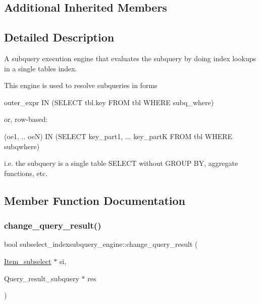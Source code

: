 \subsection*{Additional Inherited Members}


\subsection{Detailed Description}
A subquery execution engine that evaluates the subquery by doing index lookups in a single table\textquotesingle{}s index.

This engine is used to resolve subqueries in forms

outer\+\_\+expr IN (S\+E\+L\+E\+CT tbl.\+key F\+R\+OM tbl W\+H\+E\+RE subq\+\_\+where)

or, row-\/based\+:

(oe1, .. oeN) IN (S\+E\+L\+E\+CT key\+\_\+part1, ... key\+\_\+partK F\+R\+OM tbl W\+H\+E\+RE subqwhere)

i.\+e. the subquery is a single table S\+E\+L\+E\+CT without G\+R\+O\+UP BY, aggregate functions, etc. 

\subsection{Member Function Documentation}
\mbox{\label{classsubselect__indexsubquery__engine_a003053e9d46291cb9323b22a29f90c9b}} 
\subsubsection{\texorpdfstring{change\+\_\+query\+\_\+result()}{change\_query\_result()}}
{\footnotesize\ttfamily bool subselect\+\_\+indexsubquery\+\_\+engine\+::change\+\_\+query\+\_\+result (\begin{DoxyParamCaption}\item[{\mbox{\hyperlink{classItem__subselect}{Item\+\_\+subselect}} $\ast$}]{si,  }\item[{Query\+\_\+result\+\_\+subquery $\ast$}]{res }\end{DoxyParamCaption})\hspace{0.3cm}{\ttfamily [virtual]}}

